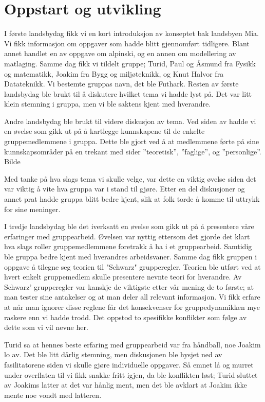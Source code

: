 
\chapter{Oppstart og utvikling}
I første landsbydag fikk vi en kort introduksjon av konseptet bak landsbyen Mia.
Vi fikk informasjon om oppgaver som hadde blitt gjennomført tidligere. Blant
annet handlet en av oppgave om alpinski, og en annen om modellering av
matlaging. Samme dag fikk vi tildelt gruppe; Turid, Paul og Åsmund fra Fysikk og
matematikk, Joakim fra Bygg og miljøteknikk, og Knut Halvor fra Datateknikk. Vi
bestemte gruppas navn, det ble Futhark. Resten av første landsbydag ble brukt
til å diskutere hvilket tema vi hadde lyst på. Det var litt klein stemning i
gruppa, men vi ble saktens kjent med hverandre. 

Andre landsbydag ble brukt til videre diskusjon av tema. Ved siden av hadde vi
en øvelse som gikk ut på å kartlegge kunnskapene til de enkelte gruppemedlemmene
i gruppa. Dette ble gjort ved å at medlemmene førte på sine kunnskapsområder på
en trekant med sider ”teoretisk”, ”faglige”, og ”personlige”. Bilde

Med tanke på hva slags tema vi skulle velge, var dette en viktig øvelse siden
det var viktig å vite hva gruppa var i stand til gjøre. Etter en del diskusjoner
og annet prat hadde gruppa blitt bedre kjent, slik at folk torde å komme til
uttrykk for sine meninger. 
 
I tredje landsbydag ble det iverksatt en øvelse som gikk ut på å presentere våre
erfaringer med gruppearbeid. Øvelsen var nyttig ettersom det gjorde det klart
hva slags roller gruppemedlemmene foretrakk å ha i et gruppearbeid. Samtidig ble
gruppa bedre kjent med hverandres arbeidsvaner. Samme dag fikk gruppen i oppgave
å tilegne seg teorien til "Schwarz" grupperegler. Teorien ble utført ved at
hvert enkelt gruppemedlem skulle presentere nevnte teori for hverandre. Av
Schwarz’ grupperegler var kanskje de viktigste etter vår mening de to første; at
man tester sine antakelser og at man deler all relevant informasjon.  Vi fikk
erfare at når man ignorer disse reglene får det konsekvenser for
gruppedynamikken mye raskere enn vi hadde trodd. Det oppstod to spesifikke
konflikter som følge av dette som vi vil nevne her.

Turid sa at hennes beste erfaring med gruppearbeid var fra håndball, noe Joakim
lo av. Det ble litt dårlig stemning, men diskusjonen ble hysjet ned av
fasilitatorene siden vi skulle gjøre individuelle oppgaver. Så emnet lå og
murret under overflaten til vi fikk snakke fritt igjen, da ble konflikten løst;
Turid sluttet av Joakims latter at det var hånlig ment, men det ble avklart at
Joakim ikke mente noe vondt med latteren.

